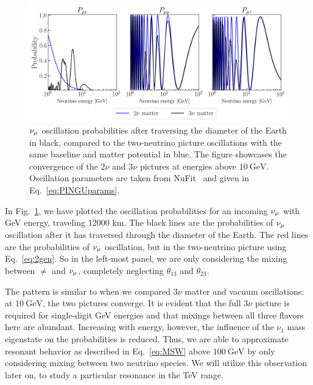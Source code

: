 \begin{figure}
    \centering
    \includegraphics[width=1\textwidth]{figures/2_vs_3.png}
    \caption{$\nu_\mu$ oscillation probabilities after traversing the diameter of the Earth in black, 
    compared to the two-neutrino picture oscillations with the same 
    baseline and matter potential in blue. The figure showcases the convergence of the $2\nu$ and $3\nu$ pictures at energies above $\SI{10}{\GeV}$.
    Oscillation parameters are taken from NuFit~\cite{nufit} and given in Eq.~\ref{eq:PINGUparams}.}\label{fig:2_vs_3}
\end{figure}

In Fig.~\ref{fig:2_vs_3}, we have plotted the oscillation probabilities for an incoming $\nu_\mu$ with \si{\GeV} energy,
traveling 12000 km. The black lines are the probabilities of $\nu_\mu$ oscillation after it has traversed through the diameter of the Earth.
The red lines are the probabilities of $\nu_\mu$ oscillation, but in the two-neutrino picture using Eq.~\ref{eq:2gen}. So in the left-most panel,
we are only considering the mixing between $\ne$ and $\nu_\mu$, completely neglecting $\theta_{13}$ and $\theta_{23}$.

The pattern is similar to when we compared $3\nu$ matter and vacuum oscillations: at $\SI{10}{\GeV}$, the two pictures converge.
It is evident that the full $3\nu$ picture is required for single-digit \si{\GeV} energies and that mixings between all three flavors here are 
abundant. Increasing with energy, however, the influence of the $\nu_1$ mass eigenstate on the probabilities is reduced.
Thus, we are able to approximate resonant behavior as described in Eq.~\ref{eq:MSW} above $\SI{100}{\GeV}$ by only considering 
mixing between two neutrino species. We will utilize this observation later on, to study a particular resonance in the \si{\TeV} range.